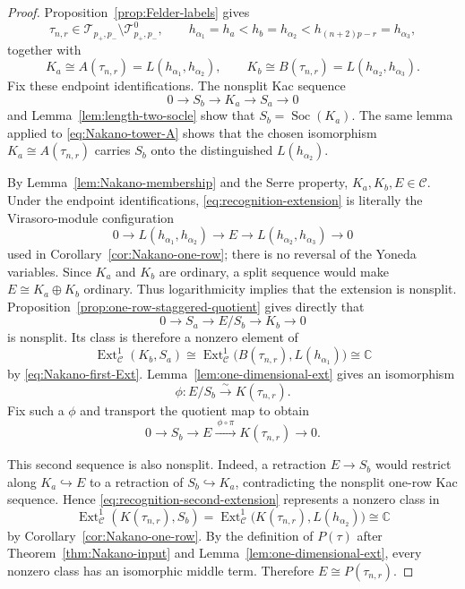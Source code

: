 \documentclass[12pt,leqno]{amsart}
\numberwithin{equation}{section}
\newcommand{\Ext}{\operatorname{Ext}}
\newcommand{\Soc}{\operatorname{Soc}}
\def\C{\mathbb{C}}
\begin{document}
\begin{proof}
Proposition~\ref{prop:Felder-labels} gives
\[
 \tau_{n,r}\in\mathcal T_{p_+,p_-}\setminus\mathcal T^0_{p_+,p_-},
 \qquad h_{\alpha_1}=h_a<h_b=h_{\alpha_2}<h_{(n+2)p-r}=h_{\alpha_3},
\]
together with
\[
 K_a\cong A(\tau_{n,r})=L(h_{\alpha_1},h_{\alpha_2}),\qquad
 K_b\cong B(\tau_{n,r})=L(h_{\alpha_2},h_{\alpha_3}).
\]
Fix these endpoint identifications.  The nonsplit Kac sequence
\[
 0\to S_b\to K_a\to S_a\to0
\]
and Lemma~\ref{lem:length-two-socle} show that $S_b=\Soc(K_a)$.
The same lemma applied to \eqref{eq:Nakano-tower-A} shows that the chosen
isomorphism $K_a\cong A(\tau_{n,r})$ carries $S_b$ onto the distinguished
$L(h_{\alpha_2})$.

By Lemma~\ref{lem:Nakano-membership} and the Serre property,
$K_a,K_b,E\in\mathscr C$.  Under the endpoint identifications,
\eqref{eq:recognition-extension} is literally the Virasoro-module
configuration
\[
 0\longrightarrow L(h_{\alpha_1},h_{\alpha_2})
 \longrightarrow E\longrightarrow
 L(h_{\alpha_2},h_{\alpha_3})\longrightarrow0
\]
used in Corollary~\ref{cor:Nakano-one-row}; there is no reversal of the
Yoneda variables.  Since $K_a$ and $K_b$ are ordinary, a split sequence
would make $E\cong K_a\oplus K_b$ ordinary.  Thus logarithmicity implies
that the extension is nonsplit.  Proposition~\ref{prop:one-row-staggered-quotient}
gives directly that
\begin{equation}\label{eq:recognition-first-quotient}
 0\longrightarrow S_a\longrightarrow E/S_b
 \longrightarrow K_b\longrightarrow0
\end{equation}
is nonsplit.  Its class is therefore
a nonzero element of
\[
 \Ext^1_{\mathscr C}(K_b,S_a)
 \cong
 \Ext^1_{\mathscr C}\bigl(B(\tau_{n,r}),L(h_{\alpha_1})\bigr)
 \cong\C
\]
by \eqref{eq:Nakano-first-Ext}.  Lemma~\ref{lem:one-dimensional-ext}
gives an isomorphism
\[
 \phi:E/S_b\xrightarrow{\sim}K(\tau_{n,r}).
\]
Fix such a $\phi$ and transport the quotient map to obtain
\begin{equation}\label{eq:recognition-second-extension}
 0\longrightarrow S_b\longrightarrow E
 \xrightarrow{\ \phi\circ\pi\ }K(\tau_{n,r})\longrightarrow0.
\end{equation}

This second sequence is also nonsplit.  Indeed, a retraction
$E\to S_b$ would restrict along $K_a\hookrightarrow E$ to a retraction
of $S_b\hookrightarrow K_a$, contradicting the nonsplit one-row Kac
sequence.  Hence \eqref{eq:recognition-second-extension} represents a
nonzero class in
\[
 \Ext^1_{\mathscr C}(K(\tau_{n,r}),S_b)
 =
 \Ext^1_{\mathscr C}
 \bigl(K(\tau_{n,r}),L(h_{\alpha_2})\bigr)
 \cong\C
\]
by Corollary~\ref{cor:Nakano-one-row}.  By the definition of $P(\tau)$
after Theorem~\ref{thm:Nakano-input} and
Lemma~\ref{lem:one-dimensional-ext}, every nonzero class
has an isomorphic middle term.  Therefore
$E\cong P(\tau_{n,r})$.
\end{proof}
\end{document}
